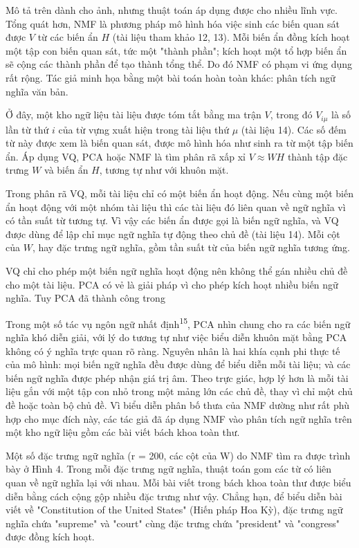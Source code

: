 Mô tả trên dành cho ảnh, nhưng thuật toán áp dụng được cho nhiều lĩnh vực. Tổng quát hơn, NMF là phương pháp mô hình hóa việc sinh các biến quan sát được \(V\) từ các biến ẩn \(H\) (tài liệu tham khảo 12, 13). Mỗi biến ẩn đồng kích hoạt một tập con biến quan sát, tức một "thành phần"; kích hoạt một tổ hợp biến ẩn sẽ cộng các thành phần để tạo thành tổng thể. Do đó NMF có phạm vi ứng dụng rất rộng. Tác giả minh họa bằng một bài toán hoàn toàn khác: phân tích ngữ nghĩa văn bản.

Ở đây, một kho ngữ liệu tài liệu được tóm tắt bằng ma trận \(V\), trong đó \(V_{i\mu}\) là số lần từ thứ \(i\) của từ vựng xuất hiện trong tài liệu thứ \(\mu\) (tài liệu 14). Các số đếm từ này được xem là biến quan sát, được mô hình hóa như sinh ra từ một tập biến ẩn. Áp dụng VQ, PCA hoặc NMF là tìm phân rã xấp xỉ \(V \approx WH\) thành tập đặc trưng \(W\) và biến ẩn \(H\), tương tự như với khuôn mặt.

Trong phân rã VQ, mỗi tài liệu chỉ có một biến ẩn hoạt động. Nếu cùng một biến ẩn hoạt động với một nhóm tài liệu thì các tài liệu đó liên quan về ngữ nghĩa vì có tần suất từ tương tự. Vì vậy các biến ẩn được gọi là biến ngữ nghĩa, và VQ được dùng để lập chỉ mục ngữ nghĩa tự động theo chủ đề (tài liệu 14). Mỗi cột của \(W\), hay đặc trưng ngữ nghĩa, gồm tần suất từ của biến ngữ nghĩa tương ứng.

VQ chỉ cho phép một biến ngữ nghĩa hoạt động nên không thể gán nhiều chủ đề cho một tài liệu. PCA có vẻ là giải pháp vì cho phép kích hoạt nhiều biến ngữ nghĩa. Tuy PCA đã thành công trong

Trong một số tác vụ ngôn ngữ nhất định\textsuperscript{15}, PCA nhìn chung cho ra các biến ngữ nghĩa khó diễn giải, với lý do tương tự như việc biểu diễn khuôn mặt bằng PCA không có ý nghĩa trực quan rõ ràng. Nguyên nhân là hai khía cạnh phi thực tế của mô hình: mọi biến ngữ nghĩa đều được dùng để biểu diễn mỗi tài liệu; và các biến ngữ nghĩa được phép nhận giá trị âm. Theo trực giác, hợp lý hơn là mỗi tài liệu gắn với một tập con nhỏ trong một mảng lớn các chủ đề, thay vì chỉ một chủ đề hoặc toàn bộ chủ đề. Vì biểu diễn phân bố thưa của NMF dường như rất phù hợp cho mục đích này, các tác giả đã áp dụng NMF vào phân tích ngữ nghĩa trên một kho ngữ liệu gồm các bài viết bách khoa toàn thư.

Một số đặc trưng ngữ nghĩa (r = 200, các cột của W) do NMF tìm ra được trình bày ở Hình 4. Trong mỗi đặc trưng ngữ nghĩa, thuật toán gom các từ có liên quan về ngữ nghĩa lại với nhau. Mỗi bài viết trong bách khoa toàn thư được biểu diễn bằng cách cộng gộp nhiều đặc trưng như vậy. Chẳng hạn, để biểu diễn bài viết về "Constitution of the United States" (Hiến pháp Hoa Kỳ), đặc trưng ngữ nghĩa chứa "supreme" và "court" cùng đặc trưng chứa "president" và "congress" được đồng kích hoạt.

